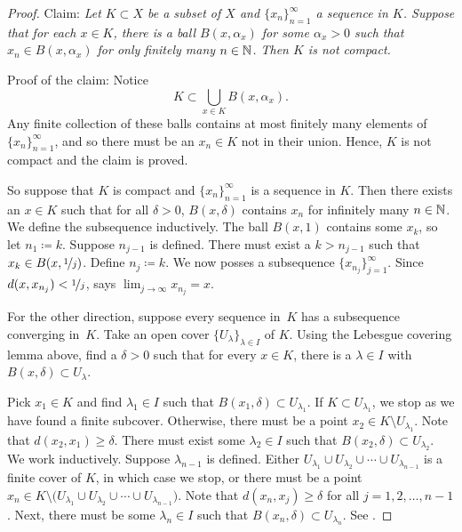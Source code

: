 \begin{proof}
Claim: \emph{Let $K \subset X$ be a subset of $X$ and
$\{ x_n \}_{n=1}^\infty$ a sequence in $K$.  Suppose that for each $x \in K$,
there is a ball $B(x,\alpha_x)$ for some $\alpha_x > 0$ such that
$x_n \in B(x,\alpha_x)$ for only finitely many $n \in {\mathbb{N}}$.
Then $K$ is not compact.}

Proof of the claim:
Notice
\begin{equation*}
K \subset \bigcup_{x \in K} B(x,\alpha_x) .
\end{equation*}
Any finite collection of these balls contains at most finitely many
elements of $\{ x_n \}_{n=1}^\infty$,
and so there must be an $x_n \in K$
not in their union.  Hence, $K$ is not compact and the claim is
proved.

So suppose that $K$ is compact and $\{ x_n \}_{n=1}^\infty$ is a sequence in $K$.
Then there exists an $x \in K$ such that
for all $\delta > 0$,
$B(x,\delta)$ contains $x_n$ for infinitely many $n \in {\mathbb{N}}$.
We define the subsequence inductively.
The ball $B(x,1)$ contains some $x_k$, so let $n_1 \coloneqq k$.
Suppose $n_{j-1}$ is defined.
There must exist a $k > n_{j-1}$
such that $x_k \in B(x,\nicefrac{1}{j})$.  Define
$n_j \coloneqq k$.
We now posses a subsequence $\{ x_{n_j} \}_{j=1}^\infty$.
Since
$d(x,x_{n_j}) < \nicefrac{1}{j}$,   says
$\lim_{j\to\infty} x_{n_j} = x$.

For the other direction, suppose every sequence in~$K$
has a 
subsequence converging in~$K$.
Take
an open cover $\{ U_\lambda \}_{\lambda \in I}$ of $K$.
Using the Lebesgue covering lemma above, find a $\delta > 0$
such that for every $x \in K$, there is a $\lambda \in I$ with
$B(x,\delta) \subset U_\lambda$.

Pick $x_1 \in K$ and find $\lambda_1 \in I$ such that $B(x_1,\delta) \subset
U_{\lambda_1}$.
If $K \subset U_{\lambda_1}$, we stop as we have found a
finite subcover.
Otherwise, there must be
a point $x_2 \in K \setminus U_{\lambda_1}$.
Note that $d(x_2,x_1) \geq \delta$.
There must exist some $\lambda_2 \in I$ such that
$B(x_2,\delta) \subset U_{\lambda_2}$.
We work inductively.  Suppose $\lambda_{n-1}$ is defined.
Either
$U_{\lambda_1} \cup
U_{\lambda_2} \cup \cdots \cup
U_{\lambda_{n-1}}$ is a finite cover of $K$, in which case we
stop, or
there must be 
a point $x_n \in K \setminus \bigl( U_{\lambda_1} \cup
U_{\lambda_2} \cup \cdots \cup
U_{\lambda_{n-1}}\bigr)$.
Note that $d(x_n,x_j) \geq \delta$ for all $j = 1,2,\ldots,n-1$.
Next, there must be some $\lambda_n \in I$
such that $B(x_n,\delta) \subset U_{\lambda_n}$.
See .


\end{proof}
